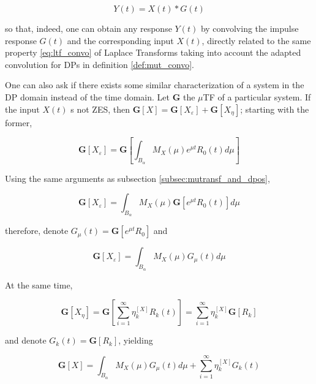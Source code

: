 \begin{equation} Y(t) = X(t)\ast G(t)\label{eq:impulse_response_convo}\end{equation}

	\noindent so that, indeed, one can obtain any response $Y(t)$ by convolving the impulse response $G(t)$ and the corresponding input $X(t)$, directly related to the same property \eqref{eq:ltf_convo} of Laplace Transforms taking into account the adapted convolution for DPs in definition \ref{def:mut_convo}.

	One can also ask if there exists some similar characterization of a system in the DP domain instead of the time domain. Let $\mathbf{G}$ the $\mu$TF of a particular system. If the input $X(t)$ s not ZES, then $\mathbf{G}\left[X\right] = \mathbf{G}\left[X_\varepsilon\right] + \mathbf{G}\left[X_\eta\right]$; starting with the former,

\begin{equation} \mathbf{G}\left[X_\varepsilon\right] = \mathbf{G}\left[\int_{B_\alpha} M_X\left(\mu\right) e^{\mu  t} R_0 (t) d\mu \right]\end{equation}

	Using the same arguments as subsection \ref{subsec:mutransf_and_dpos},

\begin{equation} \mathbf{G}\left[X_\varepsilon\right] = \int_{B_\alpha} M_X\left(\mu\right) \mathbf{G}\left[e^{\mu  t} R_0 (t) \right] d\mu \end{equation}

	\noindent therefore, denote $G_\mu(t) = \mathbf{G}\left[e^{\mu  t} R_0\right]$ and

\begin{equation} \mathbf{G}\left[X_\varepsilon\right] = \int_{B_\alpha} M_X\left(\mu\right) G_\mu(t) d\mu \end{equation}

	At the same time,

\begin{equation} \mathbf{G}\left[X_\eta\right] = \mathbf{G}\left[\sum_{i=1}^{\infty} \eta_k^{\left[X\right]} R_k(t)\right] = \sum_{i=1}^{\infty} \eta_k^{\left[X\right]} \mathbf{G}\left[R_k\right] \end{equation}

	\noindent and denote $G_k(t) = \mathbf{G}\left[R_k\right]$, yielding

\begin{equation} \mathbf{G}\left[X\right] = \int_{B_\alpha} M_X\left(\mu\right) G_\mu (t) d\mu + \sum_{i=1}^{\infty} \eta_k^{\left[X\right]} G_k (t)\label{eq:linear_g_munull}\end{equation}

